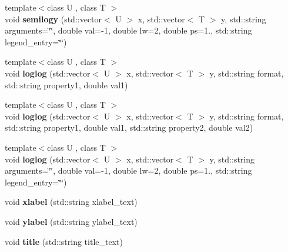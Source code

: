\begin{DoxyCompactItemize}
\item 
\hypertarget{classkeycpp_1_1_figure_a52b6a651edb036721bfa6252eae0e70d}{{\footnotesize template$<$class U , class T $>$ }\\void {\bfseries semilogy} (std\-::vector$<$ U $>$ x, std\-::vector$<$ T $>$ y, std\-::string arguments=\char`\"{}\char`\"{}, double val=-\/1, double lw=2, double ps=1., std\-::string legend\-\_\-entry=\char`\"{}\char`\"{})}\label{classkeycpp_1_1_figure_a52b6a651edb036721bfa6252eae0e70d}

\item 
\hypertarget{classkeycpp_1_1_figure_aed54e550273e8e6cd4b28b1177364a70}{{\footnotesize template$<$class U , class T $>$ }\\void {\bfseries loglog} (std\-::vector$<$ U $>$ x, std\-::vector$<$ T $>$ y, std\-::string format, std\-::string property1, double val1)}\label{classkeycpp_1_1_figure_aed54e550273e8e6cd4b28b1177364a70}

\item 
\hypertarget{classkeycpp_1_1_figure_af311b0c4a48a112abb571acc8cf9ad6a}{{\footnotesize template$<$class U , class T $>$ }\\void {\bfseries loglog} (std\-::vector$<$ U $>$ x, std\-::vector$<$ T $>$ y, std\-::string format, std\-::string property1, double val1, std\-::string property2, double val2)}\label{classkeycpp_1_1_figure_af311b0c4a48a112abb571acc8cf9ad6a}

\item 
\hypertarget{classkeycpp_1_1_figure_ae5dce11f219f879eaadc52c54bff35b4}{{\footnotesize template$<$class U , class T $>$ }\\void {\bfseries loglog} (std\-::vector$<$ U $>$ x, std\-::vector$<$ T $>$ y, std\-::string arguments=\char`\"{}\char`\"{}, double val=-\/1, double lw=2, double ps=1., std\-::string legend\-\_\-entry=\char`\"{}\char`\"{})}\label{classkeycpp_1_1_figure_ae5dce11f219f879eaadc52c54bff35b4}

\item 
\hypertarget{classkeycpp_1_1_figure_addd610a718f021f3e6c7c94f9bc7f285}{void {\bfseries xlabel} (std\-::string xlabel\-\_\-text)}\label{classkeycpp_1_1_figure_addd610a718f021f3e6c7c94f9bc7f285}

\item 
\hypertarget{classkeycpp_1_1_figure_aa965967db2165b001860f75fc22c9f28}{void {\bfseries ylabel} (std\-::string ylabel\-\_\-text)}\label{classkeycpp_1_1_figure_aa965967db2165b001860f75fc22c9f28}

\item 
\hypertarget{classkeycpp_1_1_figure_a922bd966ed40095f0ae7fa184f9d0ada}{void {\bfseries title} (std\-::string title\-\_\-text)}\label{classkeycpp_1_1_figure_a922bd966ed40095f0ae7fa184f9d0ada}


\end{DoxyCompactItemize}
